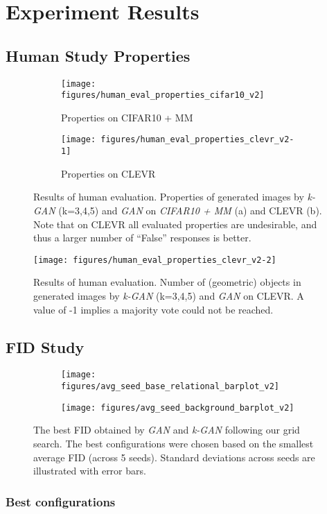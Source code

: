 \documentclass{article}
\begin{document}


\newpage
\appendix

\section{Experiment Results}
\label{app:experiment_results}
\subsection{Human Study Properties}\begin{figure}[h]
\begin{subfigure}{.5\textwidth}
  \centering
  \texttt{[image: figures/human\_eval\_properties\_cifar10\_v2]}
  \caption{Properties on CIFAR10 + MM}
  \label{fig:human_eval_properties_cifar10}
\end{subfigure}%
\begin{subfigure}{0.5\textwidth}
  \centering
  \texttt{[image: figures/human\_eval\_properties\_clevr\_v2-1]}
  \caption{Properties on CLEVR}
  \label{fig:human_eval_properties_clevr}
\end{subfigure}
\caption{Results of human evaluation. Properties of generated images by \emph{k-GAN} (k=3,4,5) and \emph{GAN} on \emph{CIFAR10 + MM} (a) and CLEVR (b). Note that on CLEVR all evaluated properties are undesirable, and thus a larger number of ``False'' responses is better.}
\end{figure}\begin{figure}[h]
\centering
\texttt{[image: figures/human\_eval\_properties\_clevr\_v2-2]}
\caption{Results of human evaluation. Number of (geometric) objects in generated images by \emph{k-GAN} (k=3,4,5) and \emph{GAN} on CLEVR. A value of -1 implies a majority vote could not be reached.}
\label{fig:human_eval_properties_clevr_counts}
\end{figure}\newpage\subsection{FID Study}\begin{figure}[h]
\begin{subfigure}{.6\textwidth}
  \centering
  \texttt{[image: figures/avg\_seed\_base\_relational\_barplot\_v2]}
  \label{fig:fid_scores1}
\end{subfigure}%
\begin{subfigure}{.4\textwidth}
  \centering
  \texttt{[image: figures/avg\_seed\_background\_barplot\_v2]}
  \label{fig:fid_scores2}
\end{subfigure}
\caption{The best FID obtained by \emph{GAN} and \emph{k-GAN} following our grid search. The best configurations were chosen based on the smallest average FID (across 5 seeds). Standard deviations across seeds are illustrated with error bars.}
\label{fig:fid_scores}
\end{figure}\newpage\subsubsection{Best configurations}
\end{document}
